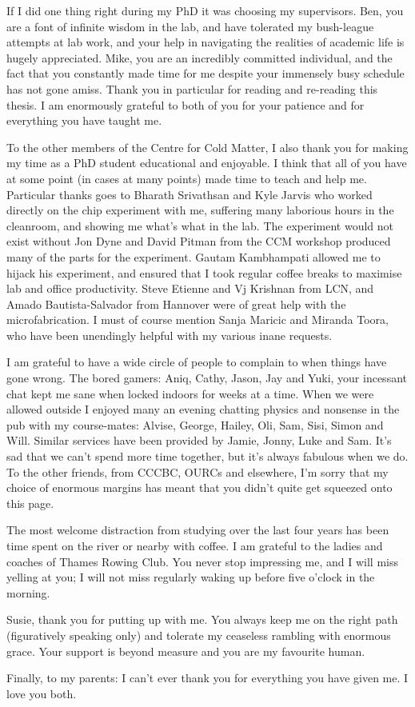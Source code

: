 \begin{singlespace}
If I did one thing right during my PhD it was choosing my supervisors. Ben, you
are a font of infinite wisdom in the lab, and have tolerated my bush-league
attempts at lab work, and your help in navigating the realities of academic
life is hugely appreciated. Mike, you are an incredibly committed individual,
and the fact that you constantly made time for me despite your immensely busy
schedule has not gone amiss. Thank you in particular for reading and re-reading
this thesis.  I am enormously grateful to both of you for your patience and for
everything you have taught me.

To the other members of the Centre for Cold Matter, I also thank you for making
my time as a PhD student educational and enjoyable. I think that all of you
have at some point (in cases at many points) made time to teach and
help me.
%
Particular thanks goes to Bharath Srivathsan and Kyle Jarvis who worked
directly on the chip experiment with me, suffering many laborious hours in the
cleanroom, and showing me what's what in the lab.
%
The experiment would not exist without Jon Dyne and David Pitman from the CCM
workshop produced many of the parts for the experiment.
%
Gautam Kambhampati allowed me to hijack his experiment, and ensured that I took
regular coffee breaks to maximise lab and office productivity.
%
Steve Etienne and Vj Krishnan from LCN, and Amado Bautista-Salvador from
Hannover were of great help with the microfabrication.
%
I must of course mention Sanja Maricic and Miranda Toora, who have been
unendingly helpful with my various inane requests.

I am grateful to have a wide circle of people to complain to when things have
gone wrong. The bored gamers: Aniq, Cathy, Jason, Jay and Yuki, your
incessant chat kept me sane when locked indoors for weeks at a time. When we
were allowed outside I enjoyed many an evening chatting physics and
nonsense in the pub with my course-mates:
Alvise, George, Hailey, Oli, Sam, Sisi, Simon and Will. 
%
Similar services have been provided by Jamie, Jonny, Luke and Sam. It's sad
that we can't spend more time together, but it's always fabulous when we do. To
the other friends, from CCCBC, OURCs and elsewhere, I'm sorry that my choice of
enormous margins has meant that you didn't quite get squeezed onto this page.

The most welcome distraction from studying over the last four years has been
time spent on the river or nearby with coffee. I am grateful to the ladies and
coaches of Thames Rowing Club. You never stop impressing me, and I will miss
yelling at you; I will not miss regularly waking up before five o'clock in the
morning.

Susie, thank you for putting up with me. You always keep me on the right path
(figuratively speaking only) and tolerate my ceaseless rambling with enormous
grace. Your support is beyond measure and you are my favourite human.

Finally, to my parents: I can't ever thank you for everything you have given
me. I love you both.

\end{singlespace}
